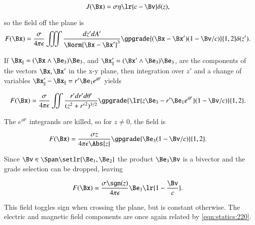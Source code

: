 \begin{dmath}\label{eqn:statics:240}
J(\Bx) = \sigma \eta \lr{ c - \Bv } \delta(z),
\end{dmath}

so the field off the plane is
\begin{dmath}\label{eqn:statics:260}
F(\Bx)
=
\frac{\sigma}{4 \pi \epsilon } \iiint \frac{dz' dA'}{ \Norm{ \Bx - \Bx' }^3 }
\gpgrade{ (\Bx - \Bx') (1 - \Bv/c) }{1,2} \delta(z').
\end{dmath}

If \( \Bx_\parallel = (\Bx \wedge \Be_3) \Be_3 \), and \( \Bx'_\parallel = (\Bx' \wedge \Be_3) \Be_3 \), are the components of the vectors \( \Bx, \Bx' \) in the x-y plane, then integration over \( z' \) and a change of variables \( \Bx'_\parallel - \Bx_\parallel = r' \Be_1 e^{i \theta'} \) yields

\begin{dmath}\label{eqn:statics:280}
F(\Bx)
=
\frac{\sigma}{4 \pi \epsilon } \iint \frac{r' dr' d\theta'}{ ( z^2 + {r'}^2 )^{3/2} }
\gpgrade{ \lr{ z \Be_3 - r' \Be_1 e^{i\theta'} } (1 - \Bv/c) }{1,2}.
\end{dmath}

The \( e^{i\theta'} \) integrands are killed, so for \( z \ne 0 \), the field is

\begin{dmath}\label{eqn:statics:300}
F(\Bx)
=
\frac{\sigma z}{4 \pi \epsilon \Abs{z} } \gpgrade{ \Be_3 (1 - \Bv/c) }{1,2}.
\end{dmath}

Since \( \Bv \in \Span \setlr{ \Be_1, \Be_2 } \) the product \( \Be_3 \Bv \) is a bivector and the grade selection can be dropped, leaving

\begin{dmath}\label{eqn:statics:320}
F(\Bx)
=
\frac{\sigma \sgn(z)}{4 \pi \epsilon } \Be_3 \lr{ 1 - \frac{\Bv}{c}}.
\end{dmath}

This field toggles sign when crossing the plane, but is constant otherwise.  The electric and magnetic field components are once again related by \cref{eqn:statics:220}.


